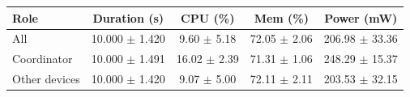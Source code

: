 \begin{tabular}{lcccc}
\hline
\textbf{Role} & \textbf{Duration (s)} & \textbf{CPU (\%)} & \textbf{Mem (\%)} & \textbf{Power (mW)} \\
\hline
All & 10.000 $\pm$ 1.420 & 9.60 $\pm$ 5.18 & 72.05 $\pm$ 2.06 & 206.98 $\pm$ 33.36 \\
Coordinator & 10.000 $\pm$ 1.491 & 16.02 $\pm$ 2.39 & 71.31 $\pm$ 1.06 & 248.29 $\pm$ 15.37 \\
Other devices & 10.000 $\pm$ 1.420 & 9.07 $\pm$ 5.00 & 72.11 $\pm$ 2.11 & 203.53 $\pm$ 32.15 \\
\hline
\end{tabular}
